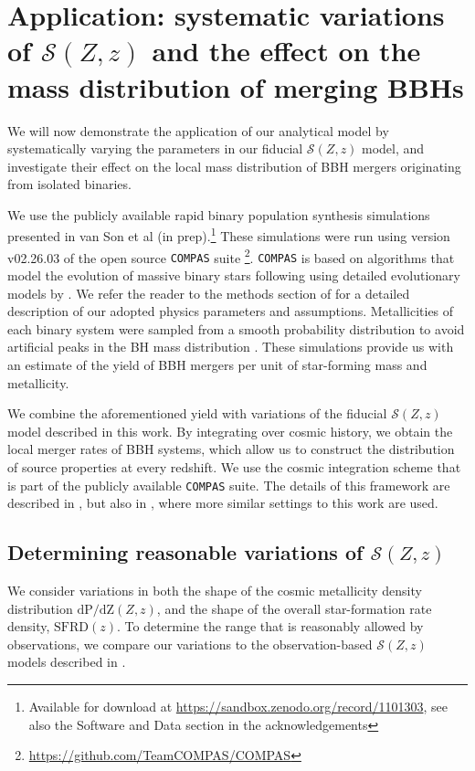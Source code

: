\documentclass[linenumbers,twocolumn]{aastex631}
\newcommand{\SFRDzZ}{\ensuremath{\mathcal{S}(Z,z)}\xspace}
\newcommand{\SFRDz}{\ensuremath{\mathrm{SFRD}(z)}\xspace}
\newcommand{\dpdZ}{\ensuremath{\mathrm{dP/dZ}(Z,z)}\xspace}
\newcommand{\COMPAS}{{\tt COMPAS}\xspace}
\begin{document}
\section{Application: systematic variations of \SFRDzZ and the effect on the mass distribution of merging BBHs \label{sec: mass dists}}

We will now demonstrate the application of our analytical model by systematically varying the parameters in our fiducial \SFRDzZ model, and investigate their effect on the local mass distribution of BBH mergers originating from isolated binaries. 


We use the publicly available rapid binary population synthesis simulations presented in van Son et al (in prep).\footnote{Available for download at \url{https://sandbox.zenodo.org/record/1101303},  see also the Software and Data section in the acknowledgements}  
These simulations were run using version v02.26.03 of the open source \COMPAS suite \citep{COMPAS_method}\footnote{\url{https://github.com/TeamCOMPAS/COMPAS}}. \COMPAS is based on algorithms that model the evolution of massive binary stars following \citet{Hurley+2000, Hurley+2002} using detailed evolutionary models by \citet{Pols+1998}.  We refer the reader to the methods section of \cite{vanson+2022} for a detailed description of our adopted physics parameters and assumptions.
%
Metallicities of each binary system were sampled from a smooth probability distribution to avoid artificial peaks in the BH mass distribution \citep[e.g.][]{Dominik2015,Kummer_thesis}. 
These simulations provide us with an estimate of the yield of BBH mergers per unit of star-forming mass and metallicity. 

We combine the aforementioned yield with variations of the fiducial \SFRDzZ model described in this work. By integrating over cosmic history, we obtain the local merger rates of BBH systems, which allow us to construct the distribution of source properties at every redshift. We use the cosmic integration scheme that is part of the publicly available \COMPAS suite. The details of this framework are described in \cite{Neijssel+2019}, but also in \cite{vanson+2022}, where more similar settings to this work are used. 


\subsection{Determining reasonable variations of \SFRDzZ \label{ss: reasonable var}}
We consider variations in both the shape of the cosmic metallicity density distribution \dpdZ, and the shape of the overall star-formation rate density, \SFRDz. To determine the range that is reasonably allowed by observations, we compare our variations to the observation-based \SFRDzZ models described in \cite{Chruslinska+2021}.
\end{document}
